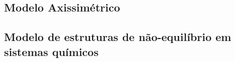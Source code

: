 \documentclass[a4paper,portuges,12pt]{article}
\begin{document}
\subsection{Modelo Axissimétrico}


\subsection{Modelo de estruturas de não-equilíbrio em sistemas químicos}
\end{document}
